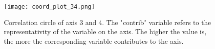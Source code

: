 \begin{figure} [!htbp]
	\begin{center}
		\texttt{[image: coord\_plot\_34.png]}
	\end{center}
	\caption[FAMD's correlation circle for third and fourth axis]{Correlation circle of axis 3 and 4. The "contrib" variable refers to the representativity of the variable on the axis. The higher the value is, the more the corresponding variable contributes to the axis.}
	\label{fig:corr_circ_34}
\end{figure}

